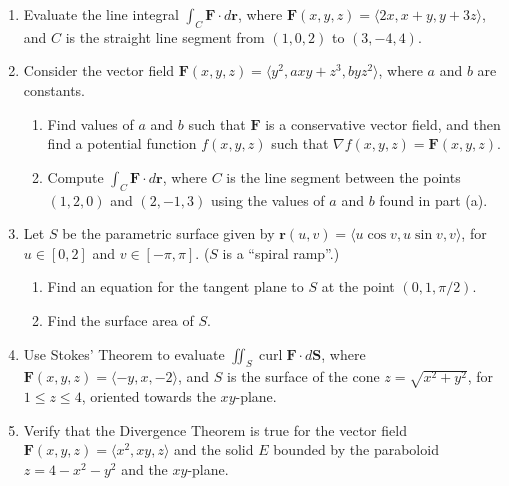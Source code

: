 \documentclass[12pt]{article}
\newcommand{\points}[1]{\marginpar{\hspace{24pt}[#1]}}
\renewcommand{\S}{\mathbf{S}}
\renewcommand{\r}{\mathbf{r}}
\newcommand{\dotp}{\,\boldsymbol{\cdot}\,}
\newcommand{\di}{\displaystyle}
\newcommand{\F}{\mathbf{F}}
\DeclareMathOperator{\curl}{curl}
\begin{document}
\begin{enumerate}
\item Evaluate the line integral $\di \int_C \F\dotp d\r$, where $\F(x,y,z) = \langle 2x, x+y, y+3z\rangle$, and $C$ is the straight line segment from $(1,0,2)$ to $(3,-4,4)$. \points{8}

\newpage


\item Consider the vector field $\F(x,y,z) = \langle y^2,axy+z^3,byz^2\rangle$, where $a$ and $b$ are constants.
\begin{enumerate}
\item Find values of $a$ and $b$ such that $\F$ is a conservative vector field, and then find a potential function $f(x,y,z)$ such that $\nabla f(x,y,z) = \F(x,y,z)$. \points{6}

\vspace{4in}

\item Compute $\di \int_C \F\dotp d\r$, where $C$ is the line segment between the points $(1,2,0)$ and $(2,-1,3)$
using the values of $a$ and $b$ found in part (a). \points{4}
\end{enumerate}
\newpage

\item Let $S$ be the parametric surface given by $\r(u,v)=\langle u\cos v, u\sin v, v\rangle$, for $u\in [0,2]$ and $v\in [-\pi,\pi]$. ($S$ is a ``spiral ramp''.)
\begin{enumerate}
\item Find an equation for the tangent plane to $S$ at the point $(0,1,\pi/2)$. \points{6}

\vspace{3.5in}

\item Find the surface area of $S$. \points{6}
\end{enumerate}
\newpage

\item Use Stokes' Theorem to evaluate $\di \iint_S \curl\F\dotp d\S$, where $\F(x,y,z) = \langle-y,x,-2\rangle$, and $S$ is the surface of the cone $z=\sqrt{x^2+y^2}$, for $1\leq z\leq 4$, oriented towards the $xy$-plane. \points{8}

\newpage

\item Verify that the Divergence Theorem is true for the vector field $\F(x,y,z) = \langle x^2, xy, z\rangle$ and the solid $E$ bounded by the paraboloid $z=4-x^2-y^2$ and the $xy$-plane. \points{12}


\end{enumerate}
\end{document}
